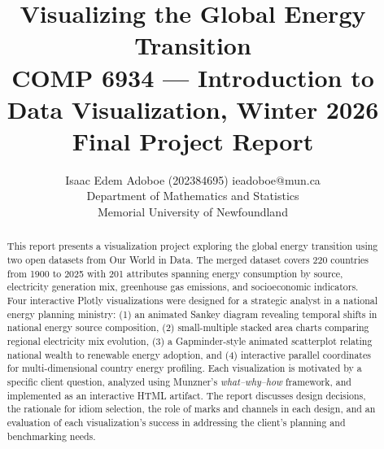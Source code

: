 \documentclass[10pt]{article}
\begin{document}

\title{Visualizing the Global Energy Transition\\
\large COMP 6934 --- Introduction to Data Visualization, Winter 2026\\
\large Final Project Report}

\author{\name Isaac Edem Adoboe  (202384695) \email ieadoboe@mun.ca \\
      \addr Department of Mathematics and Statistics\\
      Memorial University of Newfoundland}

\def\month{02}
\def\year{2026}
\def\openreview{\url{https://openreview.net/forum?id=XXXX}}

\maketitle

\begin{abstract}
This report presents a visualization project exploring the global energy transition using two open datasets from Our World in Data. The merged dataset covers 220 countries from 1900 to 2025 with 201 attributes spanning energy consumption by source, electricity generation mix, greenhouse gas emissions, and socioeconomic indicators. Four interactive Plotly visualizations were designed for a strategic analyst in a national energy planning ministry: (1) an animated Sankey diagram revealing temporal shifts in national energy source composition, (2) small-multiple stacked area charts comparing regional electricity mix evolution, (3) a Gapminder-style animated scatterplot relating national wealth to renewable energy adoption, and (4) interactive parallel coordinates for multi-dimensional country energy profiling. Each visualization is motivated by a specific client question, analyzed using Munzner's \emph{what--why--how} framework, and implemented as an interactive HTML artifact. The report discusses design decisions, the rationale for idiom selection, the role of marks and channels in each design, and an evaluation of each visualization's success in addressing the client's planning and benchmarking needs.
\end{abstract}
\end{document}
